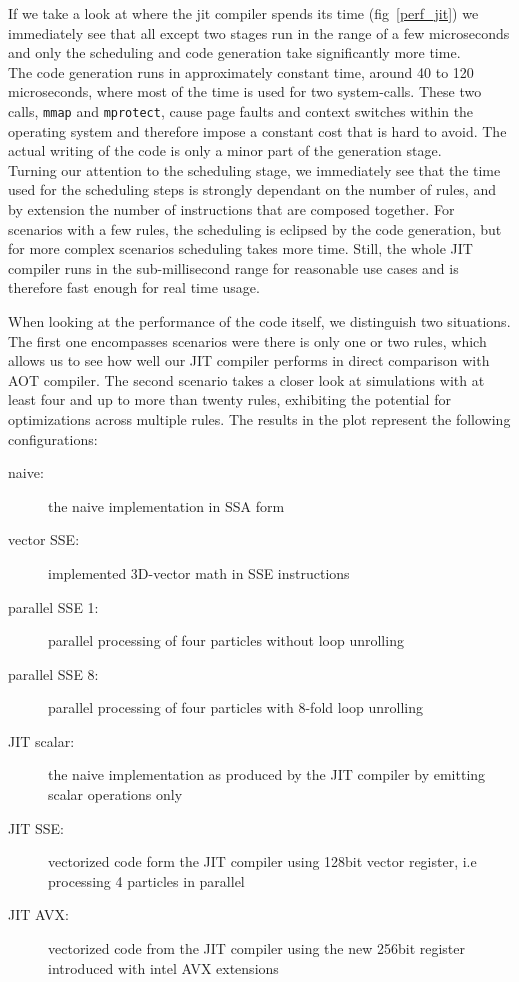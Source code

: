 If we take a look at where the jit compiler spends its time (fig~\ref{perf_jit}) we immediately see that all except two stages run in the range of a few microseconds and only the scheduling and code generation take significantly more time. \\
The code generation runs in approximately constant time, around 40 to 120 microseconds, where most of the time is used for two system-calls. These two calls, \texttt{mmap} and \texttt{mprotect}, cause page faults and context switches within the operating system and therefore impose a constant cost that is hard to avoid. The actual writing of the code is only a minor part of the generation stage. \\
Turning our attention to the scheduling stage, we immediately see that the time used for the scheduling steps is strongly dependant on the number of rules, and by extension the number of instructions that are composed together. 
For scenarios with a few rules, the scheduling is eclipsed by the code generation, but for more complex scenarios scheduling takes more time.
Still, the whole JIT compiler runs in the sub-millisecond range for reasonable use cases and is therefore fast enough for real time usage.

When looking at the performance of the code itself, we distinguish two situations. The first one encompasses scenarios were there is only one or two rules, which allows us to see how well our JIT compiler performs in direct comparison with AOT compiler. The second scenario takes a closer look at simulations with at least four and up to more than twenty rules, exhibiting the potential for optimizations across multiple rules. The results in the plot represent the following configurations:
\begin{description}
\item[naive:] the naive implementation in SSA form
\item[vector SSE:] implemented 3D-vector math in SSE instructions
\item[parallel SSE 1:] parallel processing of four particles without loop unrolling
\item[parallel SSE 8:] parallel processing of four particles with 8-fold loop unrolling
\item[JIT scalar:] the naive implementation as produced by the JIT compiler by emitting scalar operations only
\item[JIT SSE:] vectorized code form the JIT compiler using 128bit vector register, i.e processing 4 particles in parallel
\item[JIT AVX:] vectorized code from the JIT compiler using the new 256bit register introduced with intel AVX extensions
\end{description}

